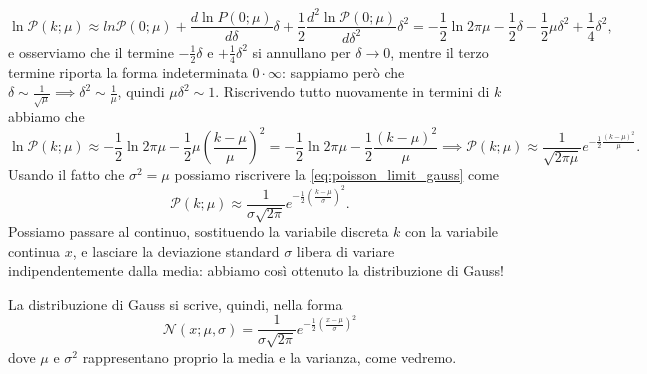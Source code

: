 \documentclass{report}
\begin{document}
\begin{myproof}
	$$
		\ln{\mathcal{P}(k; \mu)} \approx ln{\mathcal{P}(0; \mu)} + \frac{d\ln{P}(0; \mu)}{d\delta}\delta + \frac{1}{2}\frac{d^2 \ln{\mathcal{P}(0; \mu)}}{d\delta^2} \delta^2 = - \frac{1}{2} \ln{2\pi \mu} - \frac{1}{2} \delta - \frac{1}{2} \mu \delta^2 + \frac{1}{4}\delta^2,
	$$
	e osserviamo che il termine $-\frac{1}{2}\delta$ e $+\frac{1}{4}\delta^2$ si annullano per $\delta \to 0$, mentre il terzo termine riporta la forma indeterminata $0 \cdot \infty$: sappiamo però che $\delta \sim \frac{1}{\sqrt{\mu}} \implies \delta^2 \sim \frac{1}{\mu}$, quindi $\mu \delta^2 \sim 1$. Riscrivendo tutto nuovamente in termini di $k$ abbiamo che
	\begin{equation}
		\ln{\mathcal{P}(k; \mu)} \approx - \frac{1}{2} \ln{2\pi \mu} - \frac{1}{2} \mu \left( \frac{k-\mu}{\mu} \right)^2 = -\frac{1}{2} \ln{2 \pi \mu} - \frac{1}{2} \frac{(k-\mu)^2}{\mu} \implies \mathcal{P}(k; \mu) \approx \frac{1}{\sqrt{2\pi \mu}} e^{- \frac{1}{2}\frac{(k - \mu)^2}{\mu}}.
		\label{eq:poisson_limit_gauss}
	\end{equation}
Usando il fatto che $\sigma^2 = \mu$ possiamo riscrivere la \ref{eq:poisson_limit_gauss} come
$$
	\mathcal{P}(k; \mu) \approx \frac{1}{\sigma \sqrt{2\pi}} e^{-\frac{1}{2}(\frac{k - \mu}{\sigma})^2}.
$$
Possiamo passare al continuo, sostituendo la variabile discreta $k$ con la variabile continua $x$, e lasciare la deviazione standard $\sigma$ libera di variare indipendentemente dalla media: abbiamo così ottenuto la distribuzione di Gauss!
\end{myproof}
La distribuzione di Gauss si scrive, quindi, nella forma
$$
	\mathcal{N}(x; \mu, \sigma) = \frac{1}{\sigma \sqrt{2 \pi}} e^{- \frac{1}{2}(\frac{x-\mu}{\sigma})^2}
$$
dove $\mu$ e $\sigma^2$ rappresentano proprio la media e la varianza, come vedremo.
\end{document}

